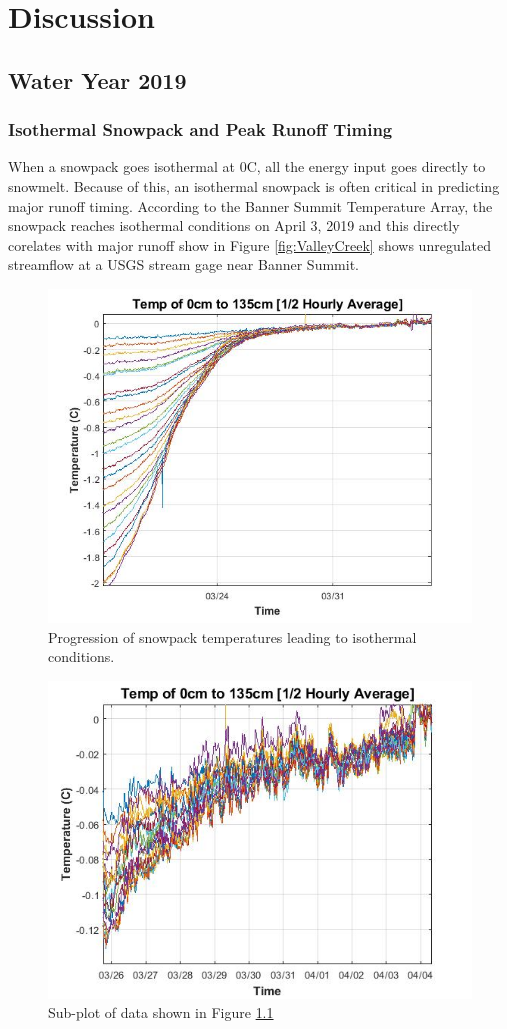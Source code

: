\chapter{Discussion}
\section{Water Year 2019} 
\subsection{Isothermal Snowpack and Peak Runoff Timing}
When a snowpack goes isothermal at 0C, all the energy input goes directly to snowmelt. Because of this, an isothermal snowpack is often critical in predicting major runoff timing. According to the Banner Summit Temperature Array, the snowpack reaches isothermal conditions on April 3, 2019 and this directly corelates with major runoff show in Figure \ref{fig:ValleyCreek} shows unregulated streamflow at a USGS stream gage near Banner Summit. 

\begin{figure}
    \centering
    \includegraphics[width=0.7\linewidth]{figures/0_135cm_Isothermal.jpg}
    \caption{Progression of snowpack temperatures leading to isothermal conditions.}
    \label{fig:0_135cm_Isothermal}
 \end{figure}
 
 \begin{figure}
    \centering
    \includegraphics[width=0.7\linewidth]{figures/0_135cm_zoom.jpg}
    \caption{Sub-plot of data shown in Figure \ref{fig:0_135cm_Isothermal}}
    \label{fig:0_135cm_Zoom}
 \end{figure}


